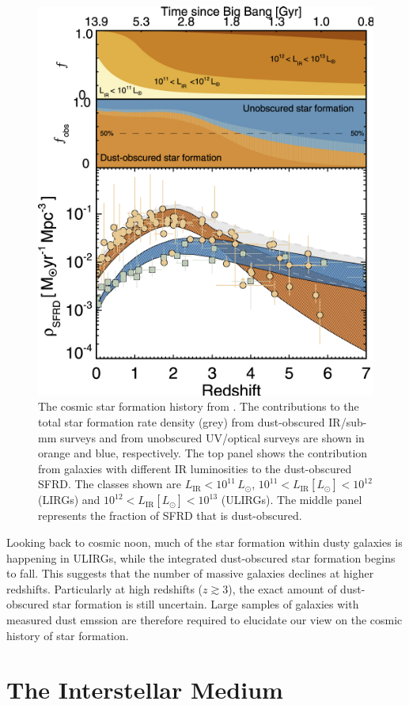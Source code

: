 \begin{figure}
    \centering
	\includegraphics[width=0.75\columnwidth]{Figures/cosmic_sfrd.pdf}
	\caption[Cosmic star formation history]{The cosmic star formation history from \citealt{Zavala_2021}. The contributions to the total star formation rate density (grey) from dust-obscured IR/sub-mm surveys and from unobscured UV/optical surveys are shown in orange and blue, respectively. The top panel shows the contribution from galaxies with different IR luminosities to the dust-obscured SFRD. The classes shown are $L_\textrm{IR} < 10^{11}\,L_\odot$, $10^{11} < L_\textrm{IR} [L_\odot] < 10^{12}$ (LIRGs) and $10^{12} < L_\textrm{IR} [L_\odot] < 10^{13}$ (ULIRGs). The middle panel represents the fraction of SFRD that is dust-obscured.}
	\label{fig:cosmic_sfrd}
\end{figure}

Looking back to cosmic noon, much of the star formation within dusty galaxies is happening in ULIRGs, while the integrated dust-obscured star formation begins to fall. This suggests that the number of massive galaxies declines at higher redshifts. Particularly at high redshifts ($z \gtrsim 3$), the exact amount of dust-obscured star formation is still uncertain. Large samples of galaxies with measured dust emssion are therefore required to elucidate our view on the cosmic history of star formation.

\section{The Interstellar Medium}

